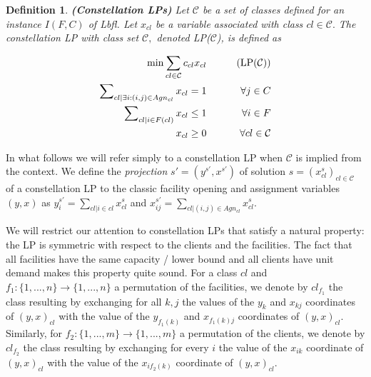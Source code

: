\documentclass[11pt]{article}\usepackage{amsmath}
\newtheorem{definition}{Definition}[section]
\newcommand{\lbfl}{{\sc Lbfl}}
\begin{document}
\begin{definition}  {\bf (Constellation LPs)} \label{def:constell}
Let $\mathcal{C}$ be a set of classes defined for an instance $I(F,C)$
of
\lbfl. Let $x_{cl}$  be a variable associated with class $cl \in
\mathcal{C}.$
The {\em  constellation LP with class set}
  $\mathcal{C},$ denoted LP($\mathcal{C}$),  is defined as 


\begin{align*} 
\min \sum_{cl \in \mathcal{C}} c_{cl}x_{cl} &&  \tag{LP($\mathcal{C}$)} \\
\sum\nolimits_{{cl} \mid  \exists i:(i,j) \in  Agn_{cl}}
x_{cl}=1 && \forall j \in C   \\
\sum\nolimits_{{cl} \mid  i  \in  F({cl})} x_{cl} \leq 1 &&
\forall i \in F  \\
 x_{cl} \geq 0  && \forall cl \in \mathcal{C} 
\end{align*} 

\iffalse
\[ \min \{ \sum_{cl \in \mathcal{C}} c_{cl}x_{cl}  \mid \sum_{{cl} \mid  \exists i:(i,j) \in  Agn_{cl}}
x_{cl}=1  \; \forall j \in C,   \;\;\; 
\sum_{{cl} \mid  i  \in  F({cl})} x_{cl} \leq 1 
\; \forall i \in F,  \;\;\;  
 x_{cl} \geq 0   \; \forall cl \in \mathcal{C}  \}
\]
\fi

\end{definition}
In what follows we will refer simply to a constellation LP when
$\mathcal{C}$ is implied from the context.  
We define the \emph{projection} $s'=(y^{s'}, x^{s'})$ of solution $s=(x^s_{cl})_{cl \in \mathcal{C}}$ 
of a  constellation LP to the classic facility opening
and assignment variables $(y,x)$ as $y_i^{s'}=\sum_{cl|i\in cl}x_{cl}^{s}$ and 
$x_{ij}^{s'}=\sum_{cl| (i,j) \in Agn_{cl}}x_{cl}^{s}$.


We will restrict our attention to  constellation LPs that satisfy a  natural property:   the LP is symmetric
 with respect to the clients and  the  facilities. 
The fact  that all facilities have the  same capacity / lower bound and all
clients have unit demand makes  this  property quite sound. 
For a class   $cl$ and
$f_1: \{1,...,n \} \rightarrow \{1,...,n \}$ a permutation of the facilities, we denote by $cl_{f_1}$
the class resulting by exchanging  for all $k, j$ the values  of the $y_{k}$  and
$x_{kj}$ coordinates 
of $(y,x)_{cl}$  with   the value of  the $y_{f_1(k)}$  and $x_{f_1(k)j}$ coordinates of
$(y,x)_{cl}$. Similarly,  for $f_2: \{1,...,  m\} \rightarrow \{1,...,
m\}$ a permutation of the clients, we denote  by $cl_{f_2}$ the class resulting  by exchanging for
every $i$  the value of  the $x_{ik}$ coordinate of  $(y,x)_{cl}$ with
 the value of the $x_{if_2(k)}$ coordinate of $(y,x)_{cl}$.
\end{document}
